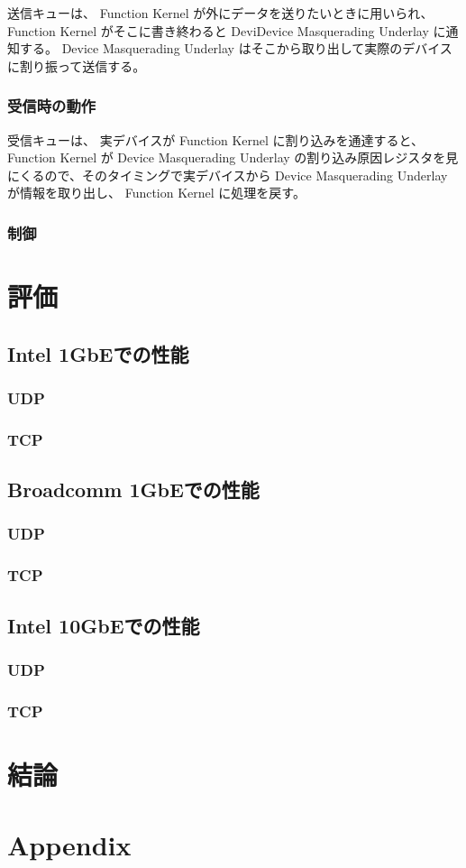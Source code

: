 \documentclass[a4paper,11pt,report]{ltjsbook}
\begin{document}
送信キューは、 Function Kernel が外にデータを送りたいときに用いられ、 Function Kernel がそこに書き終わると DeviDevice Masquerading Underlay に通知する。 Device Masquerading Underlay はそこから取り出して実際のデバイスに割り振って送信する。

\subsection{受信時の動作}

受信キューは、 実デバイスが Function Kernel に割り込みを通達すると、 Function Kernel が Device Masquerading Underlay の割り込み原因レジスタを見にくるので、そのタイミングで実デバイスから Device Masquerading Underlay が情報を取り出し、 Function Kernel に処理を戻す。

\subsection{制御}

\chapter{評価}
\section{Intel 1GbEでの性能}
\subsection{UDP}
\subsection{TCP}
\section{Broadcomm 1GbEでの性能}
\subsection{UDP}
\subsection{TCP}
\section{Intel 10GbEでの性能}
\subsection{UDP}
\subsection{TCP}

\chapter{結論}

\chapter{Appendix}


\end{document}

